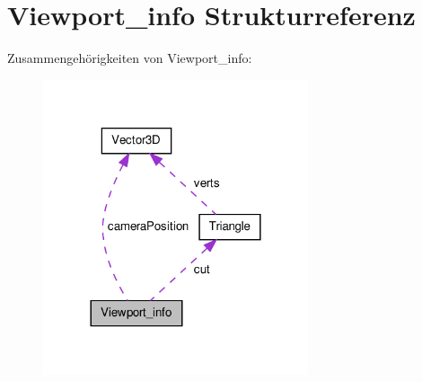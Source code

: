 \hypertarget{structViewport__info}{\section{Viewport\-\_\-info Strukturreferenz}
\label{structViewport__info}
}


Zusammengehörigkeiten von Viewport\-\_\-info\-:\nopagebreak
\begin{figure}[H]
\begin{center}
\leavevmode
\includegraphics[width=221pt]{structViewport__info__coll__graph}
\end{center}
\end{figure}
